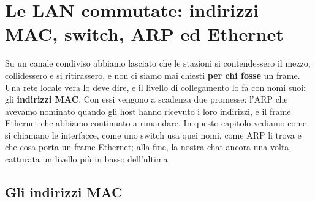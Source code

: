 \chapter{Le LAN commutate: indirizzi MAC, switch, ARP ed Ethernet}

Su un canale condiviso abbiamo lasciato che le stazioni si contendessero il mezzo, collidessero e si ritirassero, e non ci siamo
mai chiesti \textbf{per chi fosse} un frame. Una rete locale vera lo deve dire, e il livello di collegamento lo fa con nomi suoi:
gli \textbf{indirizzi MAC}. Con essi vengono a scadenza due promesse: l'ARP che avevamo nominato quando gli host hanno ricevuto i
loro indirizzi, e il frame Ethernet che abbiamo continuato a rimandare. In questo capitolo vediamo come si chiamano le interfacce,
come uno switch usa quei nomi, come ARP li trova e che cosa porta un frame Ethernet; alla fine, la nostra chat ancora una volta,
catturata un livello più in basso dell'ultima.

\section{Gli indirizzi MAC}


